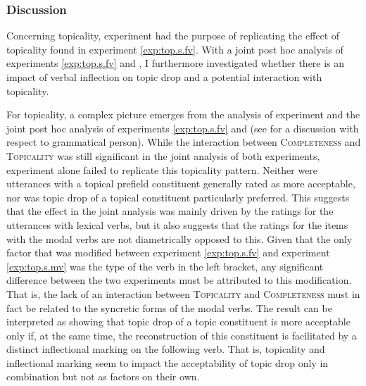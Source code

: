 \subsubsection{Discussion}\label{sec:exp.top.s.mv.diss}
Concerning topicality, experiment  had the purpose of replicating the effect of topicality found in experiment \ref*{exp:top.s.fv}.
With a joint post hoc analysis of experiments \ref*{exp:top.s.fv} and , I furthermore investigated whether there is an impact of verbal inflection on topic drop and a potential interaction with topicality.

For topicality, a complex picture emerges from the analysis of experiment  and the joint post hoc analysis of experiments \ref*{exp:top.s.fv} and  (see  for a discussion with respect to grammatical person).
While the interaction between \textsc{Completeness} and \textsc{Topicality} was still significant in the joint analysis of both experiments, experiment  alone failed to replicate this topicality pattern.
Neither were utterances with a topical prefield constituent generally rated as more acceptable, nor was topic drop of a topical constituent particularly preferred.
This suggests that the effect in the joint analysis was mainly driven by the ratings for the utterances with lexical verbs,  but it also suggests that the ratings for the items with the modal verbs  are not diametrically opposed to this.
Given that the only factor that was modified between experiment \ref*{exp:top.s.fv} and experiment \ref*{exp:top.s.mv} was the type of the verb in the left bracket, any significant difference between the two experiments must be attributed to this modification.
That is, the lack of an interaction between \textsc{Topicality} and \textsc{Completeness} must in fact be related to the syncretic  forms of the modal verbs. 
The result can be interpreted as showing that topic drop of a topic constituent is more acceptable only if, at the same time, the reconstruction of this constituent is facilitated by a distinct inflectional marking on the following verb.
That is, topicality and inflectional marking seem to impact the acceptability of topic drop only in combination but not as factors on their own. 


